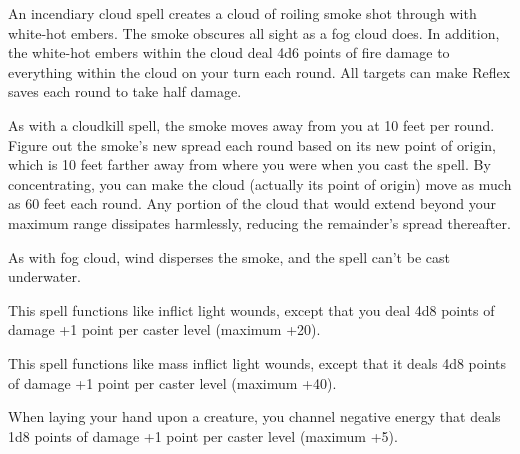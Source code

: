 \begin{multicols}{2}
\begin{small}
\noindent An incendiary cloud spell creates a cloud of roiling smoke shot through with white-hot embers. The smoke obscures all sight as a fog cloud does. In addition, the white-hot embers within the cloud deal 4d6 points of fire damage to everything within the cloud on your turn each round. All targets can make Reflex saves each round to take half damage.

\smallskip\noindent As with a cloudkill spell, the smoke moves away from you at 10 feet per round. Figure out the smoke's new spread each round based on its new point of origin, which is 10 feet farther away from where you were when you cast the spell. By concentrating, you can make the cloud (actually its point of origin) move as much as 60 feet each round. Any portion of the cloud that would extend beyond your maximum range dissipates harmlessly, reducing the remainder's spread thereafter.

\smallskip\noindent As with fog cloud, wind disperses the smoke, and the spell can't be cast underwater.

\noindent This spell functions like inflict light wounds, except that you deal 4d8 points of damage +1 point per caster level (maximum +20).

\noindent This spell functions like mass inflict light wounds, except that it deals 4d8 points of damage +1 point per caster level (maximum +40).

\noindent When laying your hand upon a creature, you channel negative energy that deals 1d8 points of damage +1 point per caster level (maximum +5).


\end{small}
\end{multicols}
